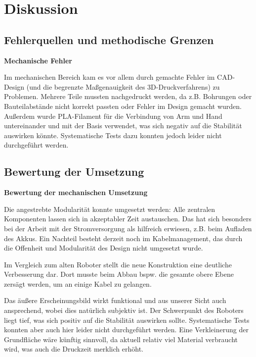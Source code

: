 \section{Diskussion}


\subsection{Fehlerquellen und methodische Grenzen}

\textbf{Mechanische Fehler}

Im mechanischen Bereich kam es vor allem durch gemachte Fehler im CAD-Design (und die begrenzte Maßgenauigkeit des 3D-Druckverfahrens) zu Problemen. Mehrere Teile mussten nachgedruckt werden, da z.B. Bohrungen oder Bauteilabstände nicht korrekt passten oder Fehler im Design gemacht wurden. 
Außerdem wurde PLA-Filament für die Verbindung von Arm und Hand untereinander und mit der Basis verwendet, was sich negativ auf die Stabilität auswirken könnte. Systematische Tests dazu konnten jedoch leider nicht durchgeführt werden.

\subsection{Bewertung der Umsetzung}

\textbf{Bewertung der mechanischen Umsetzung}

Die angestrebte Modularität konnte umgesetzt werden: Alle zentralen Komponenten lassen sich in akzeptabler Zeit austauschen. Das hat sich besonders bei der Arbeit mit der Stromversorgung als hilfreich erwiesen, z.B. beim Aufladen des Akkus. Ein Nachteil besteht derzeit noch im Kabelmanagement, das durch die Offenheit und Modularität des Design nicht umgesetzt wurde.

Im Vergleich zum alten Roboter stellt die neue Konstruktion eine deutliche Verbesserung dar. Dort musste beim Abbau bspw. die gesamte obere Ebene zersägt werden, um an einige Kabel zu gelangen.

Das äußere Erscheinungsbild wirkt funktional und aus unserer Sicht auch ansprechend, wobei dies natürlich subjektiv ist. Der Schwerpunkt des Roboters liegt tief, was sich positiv auf die Stabilität auswirken sollte. Systematische Tests konnten aber auch hier leider nicht durchgeführt werden. Eine Verkleinerung der Grundfläche wäre künftig sinnvoll, da aktuell relativ viel Material verbraucht wird, was auch die Druckzeit merklich erhöht. 

